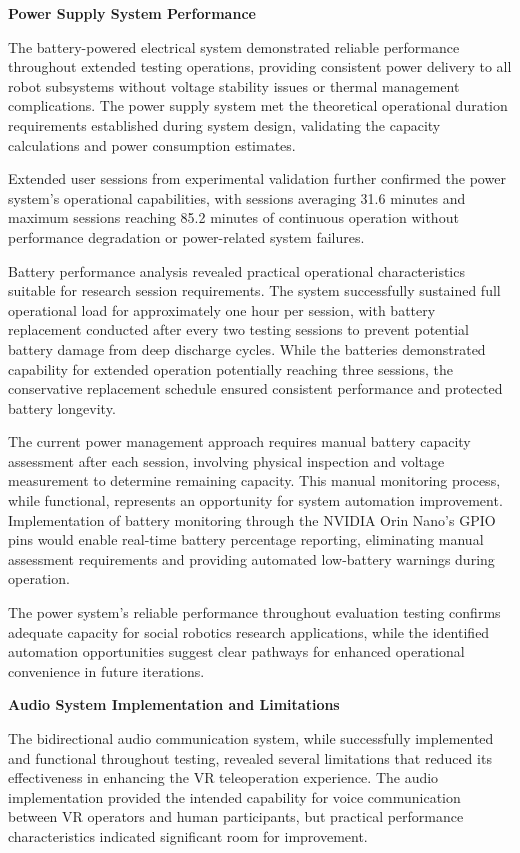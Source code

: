 \textbf{Power Supply System Performance}

The battery-powered electrical system demonstrated reliable performance throughout extended testing operations, providing consistent power delivery to all robot subsystems without voltage stability issues or thermal management complications. The power supply system met the theoretical operational duration requirements established during system design, validating the capacity calculations and power consumption estimates.

Extended user sessions from experimental validation further confirmed the power system's operational capabilities, with sessions averaging 31.6 minutes and maximum sessions reaching 85.2 minutes of continuous operation without performance degradation or power-related system failures.

Battery performance analysis revealed practical operational characteristics suitable for research session requirements. The system successfully sustained full operational load for approximately one hour per session, with battery replacement conducted after every two testing sessions to prevent potential battery damage from deep discharge cycles. While the batteries demonstrated capability for extended operation potentially reaching three sessions, the conservative replacement schedule ensured consistent performance and protected battery longevity.

The current power management approach requires manual battery capacity assessment after each session, involving physical inspection and voltage measurement to determine remaining capacity. This manual monitoring process, while functional, represents an opportunity for system automation improvement. Implementation of battery monitoring through the NVIDIA Orin Nano's GPIO pins would enable real-time battery percentage reporting, eliminating manual assessment requirements and providing automated low-battery warnings during operation.

The power system's reliable performance throughout evaluation testing confirms adequate capacity for social robotics research applications, while the identified automation opportunities suggest clear pathways for enhanced operational convenience in future iterations.

\textbf{Audio System Implementation and Limitations}

The bidirectional audio communication system, while successfully implemented and functional throughout testing, revealed several limitations that reduced its effectiveness in enhancing the VR teleoperation experience. The audio implementation provided the intended capability for voice communication between VR operators and human participants, but practical performance characteristics indicated significant room for improvement.

